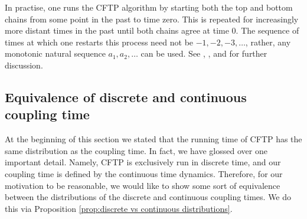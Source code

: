 	In practise, one runs the CFTP algorithm by starting both the top and bottom chains from some point in the past to time zero. This is repeated for increasingly more distant times in the past until both chains agree at time 0. The sequence of times at which one restarts this process need not be $-1, -2, -3, \dots$, rather, any monotonic natural sequence $a_1, a_2,\dots$ can  be used. See \cite{Levin2009-fo}, \cite{Haggstrom2002-os}, and \cite{Jerrum1998-ph} for further discussion.

	\subsection{Equivalence of discrete and continuous coupling time}
	At the beginning of this section we stated that the running time of CFTP has the same distribution as the coupling time. In fact, we have glossed over one important detail. Namely, CFTP is exclusively run in discrete time, and our coupling time is defined by the continuous time dynamics. Therefore, for our motivation to be reasonable, we would like to show some sort of equivalence between the distributions of the discrete and continuous coupling times. We do this via Proposition \ref{prop:discrete vs continuous distributions}. 

